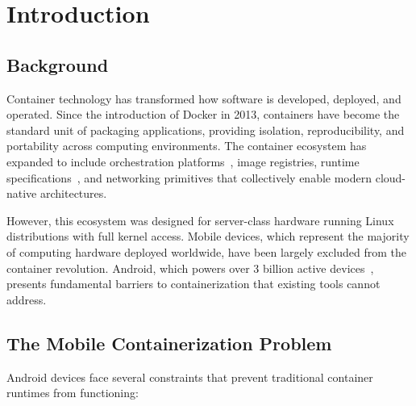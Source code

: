\chapter{Introduction}
\label{ch:introduction}

\section{Background}
\label{sec:background}

Container technology has transformed how software is developed,
deployed, and operated. Since the introduction of Docker in 2013,
containers have become the standard unit of packaging applications,
providing isolation, reproducibility, and portability across computing
environments. The container ecosystem has expanded to include
orchestration platforms~\cite{burns2016borg}, image registries,
runtime specifications~\cite{open2021runtime}, and networking
primitives that collectively enable modern cloud-native architectures.

However, this ecosystem was designed for server-class hardware running
Linux distributions with full kernel access. Mobile devices, which
represent the majority of computing hardware deployed worldwide, have
been largely excluded from the container revolution. Android, which
powers over 3 billion active devices~\cite{statcounter2025}, presents
fundamental barriers to containerization that existing tools cannot
address.

\section{The Mobile Containerization Problem}
\label{sec:mobile-problem}

Android devices face several constraints that prevent traditional
container runtimes from functioning:

